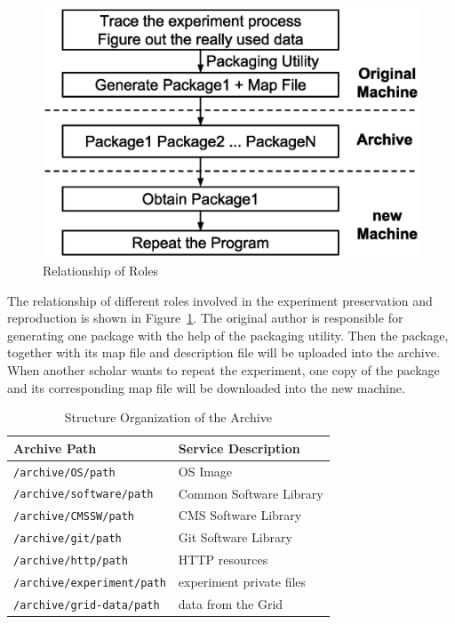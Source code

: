 \documentclass{sig-alternate}
\begin{document}
\begin{figure}
\centering
\includegraphics[width=.8\columnwidth]{solution3.eps}
\caption{Relationship of Roles}
\label{fig:solution3}
\end{figure}

The relationship of different roles involved in the experiment preservation and
reproduction is shown in Figure~\ref{fig:solution3}.  The original author is
responsible for generating one package with the help of the packaging utility. Then the package, together with
its map file and description file will be uploaded into the archive. When
another scholar wants to repeat the experiment, one copy of the package and its
corresponding map file will be downloaded into the new machine.

\begin{table}
    \centering
    \begin{tabular}{|l|l|}
        \hline
        \bf Archive Path & \bf Service Description \\ \hline
        {\tt /archive/OS/path} & OS Image \\ \hline
        {\tt /archive/software/path} & Common Software Library \\ \hline
        {\tt /archive/CMSSW/path} & CMS Software Library \\ \hline
        {\tt /archive/git/path} & Git Software Library \\ \hline
        {\tt /archive/http/path} & HTTP resources \\ \hline
        {\tt /archive/experiment/path} & experiment private files \\ \hline
        {\tt /archive/grid-data/path} & data from the Grid \\ \hline
    \end{tabular}
    \caption{Structure Organization of the Archive}
    \label{table:archive-map}
\end{table}
\end{document}
